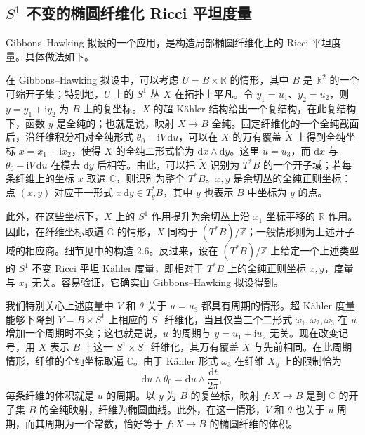 \subsection{\texorpdfstring{$S^1$}{S¹} 不变的椭圆纤维化 Ricci 平坦度量}\label{sec:7.1.3}

Gibbons--Hawking 拟设的一个应用，是构造局部椭圆纤维化上的 Ricci 平坦度量。具体做法如下。

在 Gibbons--Hawking 拟设中，可以考虑 $U=B\times\mathbb R$ 的情形，其中 $B$ 是 $\mathbb R^2$ 的一个可缩开子集；特别地，$U$ 上的 $S^1$ 丛 $X$ 在拓扑上平凡。令 $y_1=u_1$、$y_2=u_2$，则 $y=y_1+\mathrm i y_2$ 为 $B$ 上的复坐标。$X$ 的超 Kähler 结构给出一个复结构，在此复结构下，函数 $y$ 是全纯的；也就是说，映射 $X\to B$ 全纯。固定纤维化的一个全纯截面后，沿纤维积分相对全纯形式 $\theta_0-\mathrm i V\,\mathrm du$，可以在 $X$ 的万有覆盖 $\widetilde X$ 上得到全纯坐标 $x=x_1+\mathrm i x_2$，使得 $X$ 的全纯二形式恰为 $\mathrm dx\wedge\mathrm dy$。这里 $u=u_3$，而 $\mathrm dx$ 与 $\theta_0-\mathrm i V\,\mathrm du$ 在模去 $\mathrm dy$ 后相等。由此，可以把 $\widetilde X$ 识别为 $T^*B$ 的一个开子域；若每条纤维上的坐标 $x$ 取遍 $\mathbb C$，则识别为整个 $T^*B$。$x,y$ 是余切丛的全纯正则坐标：点 $(x,y)$ 对应于一形式 $x\,\mathrm dy\in T_y^*B$，其中 $y$ 也表示 $B$ 中坐标为 $y$ 的点。

此外，在这些坐标下，$X$ 上的 $S^1$ 作用提升为余切丛上沿 $x_1$ 坐标平移的 $\mathbb R$ 作用。因此，在纤维坐标取遍 $\mathbb C$ 的情形，$X$ 同构于 $(T^*B)/\mathbb Z$；一般情形则为上述开子域的相应商。细节见中的构造 2.6。反过来，设在 $(T^*B)/\mathbb Z$ 上给定一个上述类型的 $S^1$ 不变 Ricci 平坦 Kähler 度量，即相对于 $T^*B$ 上的全纯正则坐标 $x,y$，度量与 $x_1$ 无关。容易验证，它确实由 Gibbons--Hawking 拟设得到。

我们特别关心上述度量中 $V$ 和 $\theta$ 关于 $u=u_3$ 都具有周期的情形。超 Kähler 度量能够下降到 $Y=B\times S^1$ 上相应的 $S^1$ 纤维化，当且仅当三个二形式 $\omega_1,\omega_2,\omega_3$ 在 $u$ 增加一个周期时不变；这也就是说，$u$ 的周期与 $y=u_1+\mathrm i u_2$ 无关。现在改变记号，用 $X$ 表示 $B$ 上这一 $S^1\times S^1$ 纤维化，其万有覆盖 $\widetilde X$ 与先前相同。在此周期情形，纤维的全纯坐标取遍 $\mathbb C$。由于 Kähler 形式 $\omega_3$ 在纤维 $X_y$ 上的限制恰为
\[
\mathrm du\wedge\theta_0=\mathrm du\wedge\frac{\mathrm dt}{2\pi},
\]
每条纤维的体积就是 $u$ 的周期。以 $y$ 为 $B$ 的复坐标，映射 $f\colon X\to B$ 是到 $\mathbb C$ 的开子集 $B$ 的全纯映射，纤维为椭圆曲线。此外，在这一情形，$V$ 和 $\theta$ 也关于 $u$ 周期，而其周期为一个常数，恰好等于 $f\colon X\to B$ 的椭圆纤维的体积。


